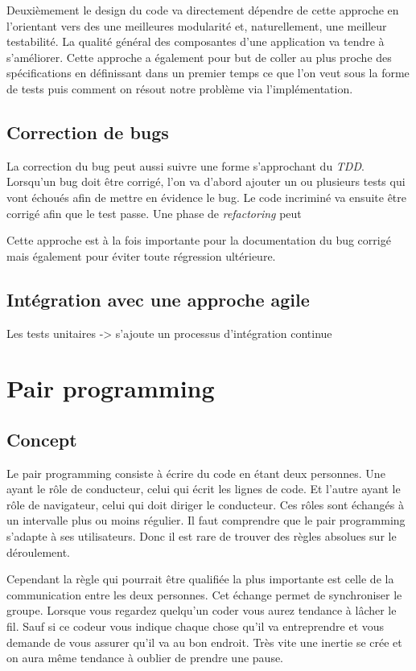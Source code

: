\documentclass[journal, a4paper, frenchb]{IEEEtran}
\begin{document}
Deuxièmement le design du code va directement dépendre de cette approche en l'orientant vers des une meilleures modularité et, naturellement, une meilleur testabilité. La qualité général des composantes d'une application va tendre à s'améliorer. Cette approche a également pour but de coller au plus proche des spécifications en définissant dans un premier temps ce que l'on veut sous la forme de tests puis comment on résout notre problème via l'implémentation.


\subsection{Correction de bugs}

La correction du bug peut aussi suivre une forme s'approchant du \emph{TDD}. Lorsqu'un bug doit être corrigé, l'on va d'abord ajouter un ou plusieurs tests qui vont échoués afin de mettre en évidence le bug. Le code incriminé va ensuite être corrigé afin que le test passe. Une phase de \emph{refactoring} peut

Cette approche est à la fois importante pour la documentation du bug corrigé mais également pour éviter toute régression ultérieure.


\subsection{Intégration avec une approche agile}

Les tests unitaires -> s'ajoute un processus d'intégration continue



\section{Pair programming}
\subsection{Concept}
Le pair programming consiste à écrire du code en étant deux personnes. Une ayant le rôle de conducteur, celui qui écrit les lignes de code. Et l’autre ayant le rôle de navigateur, celui qui doit diriger le conducteur. Ces rôles sont échangés à un intervalle plus ou moins régulier. Il faut comprendre que le pair programming s’adapte à ses utilisateurs. Donc il est rare de trouver des règles absolues sur le déroulement.

Cependant la règle qui pourrait être qualifiée la plus importante est celle de la communication entre les deux personnes. Cet échange permet de synchroniser le groupe. Lorsque vous regardez quelqu’un coder vous aurez tendance à lâcher le fil. Sauf si ce codeur vous indique chaque chose qu’il va entreprendre et vous demande de vous assurer qu’il va au bon endroit. Très vite une inertie se crée et on aura même tendance à oublier de prendre une pause.
\end{document}
